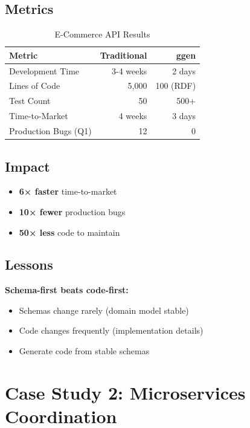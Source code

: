 \subsection{Metrics}

\begin{table}[h]
\centering
\caption{E-Commerce API Results}
\begin{tabular}{lrr}
\toprule
\textbf{Metric} & \textbf{Traditional} & \textbf{ggen} \\
\midrule
Development Time & 3-4 weeks & 2 days \\
Lines of Code & 5,000 & 100 (RDF) \\
Test Count & 50 & 500+ \\
Time-to-Market & 4 weeks & 3 days \\
Production Bugs (Q1) & 12 & 0 \\
\bottomrule
\end{tabular}
\end{table}

\subsection{Impact}

\begin{itemize}
    \item \textbf{6× faster} time-to-market
    \item \textbf{10× fewer} production bugs
    \item \textbf{50× less} code to maintain
\end{itemize}

\subsection{Lessons}

\textbf{Schema-first beats code-first:}
\begin{itemize}
    \item Schemas change rarely (domain model stable)
    \item Code changes frequently (implementation details)
    \item Generate code from stable schemas
\end{itemize}

\section{Case Study 2: Microservices Coordination}

